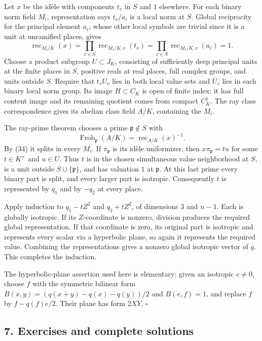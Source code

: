 \documentclass[11pt,a4paper]{article}
\begin{document}
Let \(x\) be the idèle with components \(t_v\) in \(S\) and \(1\)
elsewhere. For each binary norm field \(M_i\), representation says
\(t_v/a_i\) is a local norm at \(S\). Global reciprocity for the
principal element \(a_i\), whose other local symbols are trivial since
it is a unit at unramified places, gives \[
\operatorname{rec}_{M_i/K}(x)
=\prod_{v\in S}\operatorname{rec}_{M_i/K,v}(t_v)
=\prod_{v\in S}\operatorname{rec}_{M_i/K,v}(a_i)=1.
\tag{34}
\] Choose a product subgroup \(U\subset J_K\), consisting of
sufficiently deep principal units at the finite places in \(S\),
positive reals at real places, full complex groups, and units outside
\(S\). Require that \(t_vU_v\) lies in both local value sets and \(U_v\)
lies in each binary local norm group. Its image \(H\subset C_K\) is open
of finite index: it has full content image and its remaining quotient
comes from compact \(C_K^1\). The ray class correspondence gives its
abelian class field \(A/K\), containing the \(M_i\).

The ray-prime theorem chooses a prime \(\mathfrak p\notin S\) with \[
\operatorname{Frob}_{\mathfrak p}(A/K)
=\operatorname{rec}_{A/K}(x)^{-1}.
\] By (34) it splits in every \(M_i\). If \(\pi_{\mathfrak p}\) is its
idèle uniformizer, then \(x\pi_{\mathfrak p}=t u\) for some
\(t\in K^\times\) and \(u\in U\). Thus \(t\) is in the chosen
simultaneous value neighborhood at \(S\), is a unit outside
\(S\cup\{\mathfrak p\}\), and has valuation \(1\) at \(\mathfrak p\). At
this last prime every binary part is split, and every larger part is
isotropic. Consequently \(t\) is represented by \(q_1\) and by \(-q_2\)
at every place.

Apply induction to \(q_1-tZ^2\) and \(q_2+tZ^2\), of dimensions \(3\)
and \(n-1\). Each is globally isotropic. If its \(Z\)-coordinate is
nonzero, division produces the required global representation. If that
coordinate is zero, its original part is isotropic and represents every
scalar via a hyperbolic plane, so again it represents the required
value. Combining the representations gives a nonzero global isotropic
vector of \(q\). This completes the induction.

The hyperbolic-plane assertion used here is elementary: given an
isotropic \(e\ne0\), choose \(f\) with the symmetric bilinear form
\(B(x,y)=(q(x+y)-q(x)-q(y))/2\) and \(B(e,f)=1\), and replace \(f\) by
\(f-q(f)e/2\). Their plane has form \(2XY\). \(\square\)

\subsection{7. Exercises and complete
solutions}\label{exercises-and-complete-solutions}
\end{document}

